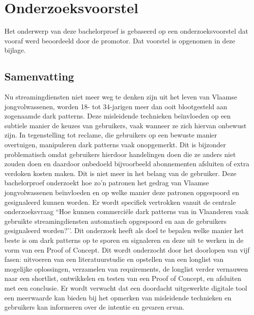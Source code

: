 \documentclass[dutch,dit,thesis]{hogentreport}
\begin{document}








%
%




\appendix

\chapter{Onderzoeksvoorstel}

Het onderwerp van deze bachelorproef is gebaseerd op een onderzoeksvoorstel dat vooraf werd beoordeeld door de promotor. Dat voorstel is opgenomen in deze bijlage.


\section*{Samenvatting}

Nu streamingdiensten niet meer weg te denken zijn uit het leven van Vlaamse jongvolwassenen, worden 18- tot 34-jarigen meer dan ooit blootgesteld aan zogenaamde dark patterns. Deze misleidende technieken beïnvloeden op een subtiele manier de keuzes van gebruikers, vaak wanneer ze zich hiervan onbewust zijn. In tegenstelling tot reclame, die gebruikers op een bewuste manier overtuigen, manipuleren dark patterns vaak onopgemerkt. Dit is bijzonder problematisch omdat gebruikers hierdoor handelingen doen die ze anders niet zouden doen en daardoor onbedoeld bijvoorbeeld abonnementen afsluiten of extra verdoken kosten maken. Dit is niet meer in het belang van de gebruiker. Deze bachelorproef onderzoekt hoe zo’n patronen het gedrag van Vlaamse jongvolwassenen beïnvloeden en op welke manier deze patronen opgespoord en gesignaleerd kunnen worden. Er wordt specifiek vertrokken vanuit de centrale onderzoeksvraag ``Hoe kunnen commerciële dark patterns van in Vlaanderen vaak gebruikte streamingdiensten automatisch opgespoord en aan de gebruikers gesignaleerd worden?’’. Dit onderzoek heeft als doel te bepalen welke manier het beste is om dark patterns op te sporen en signaleren en deze uit te werken in de vorm van een Proof of Concept. Dit wordt onderzocht door het doorlopen van vijf fasen: uitvoeren van een literatuurstudie en opstellen van een longlist van mogelijke oplossingen, verzamelen van requirements, de longlist verder vernauwen naar een shortlist, ontwikkelen en testen van een Proof of Concept, en afsluiten met een conclusie. Er wordt verwacht dat een doordacht uitgewerkte digitale tool een meerwaarde kan bieden bij het opmerken van misleidende technieken en gebruikers kan informeren over de intentie en gevaren ervan.
\end{document}
